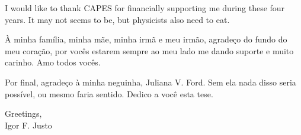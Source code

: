 I would like to thank CAPES for financially supporting me during these four years. It may not
seems to be, but physicists also need to eat.

\`A minha fam\'ilia, minha m\~ae, minha irm\~a e meu irm\~ao, agrade\c{c}o do fundo do meu
cora\c{c}\~ao, por voc\^es estarem sempre ao meu lado me dando suporte e muito carinho. Amo
todos voc\^es.

Por final, agrade\c{c}o \`a minha neguinha, Juliana V. Ford. Sem ela nada disso seria
poss\'ivel, ou mesmo faria sentido. Dedico a voc\^e esta tese.

Greetings,\\
\indent Igor F. Justo

\thispagestyle{empty}

\newpage

\thispagestyle{empty}
\ 
